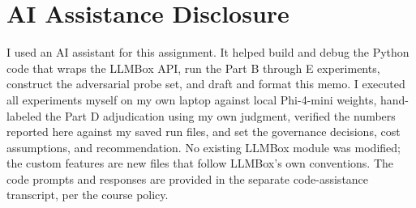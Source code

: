 \documentclass[11pt]{article}
\begin{document}
\section*{AI Assistance Disclosure}
I used an AI assistant for this assignment. It helped build and debug the Python code that wraps the LLMBox API, run the Part B through E experiments, construct the adversarial probe set, and draft and format this memo. I executed all experiments myself on my own laptop against local Phi-4-mini weights, hand-labeled the Part D adjudication using my own judgment, verified the numbers reported here against my saved run files, and set the governance decisions, cost assumptions, and recommendation. No existing LLMBox module was modified; the custom features are new files that follow LLMBox's own conventions. The code prompts and responses are provided in the separate code-assistance transcript, per the course policy.
\end{document}
